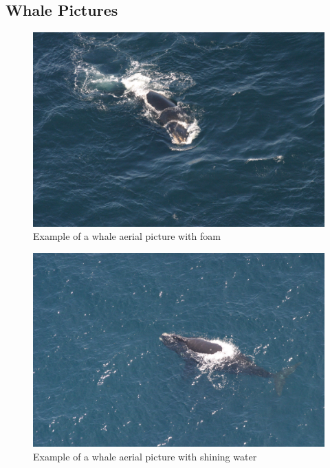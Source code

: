 \documentclass[11pt,a4paper,oneside]{article}
\begin{document}
\begin{appendices}
\chapter*{Whale Pictures}

\begin{figure}
	\centering
	\includegraphics[scale=0.1]{foam.jpg}
	\caption{Example of a whale aerial picture with foam}
\end{figure}

\begin{figure}
	\centering
	\includegraphics[scale=0.15]{water.jpg}
	\caption{Example of a whale aerial picture with shining water}
\end{figure}


\end{appendices}
\end{document}
